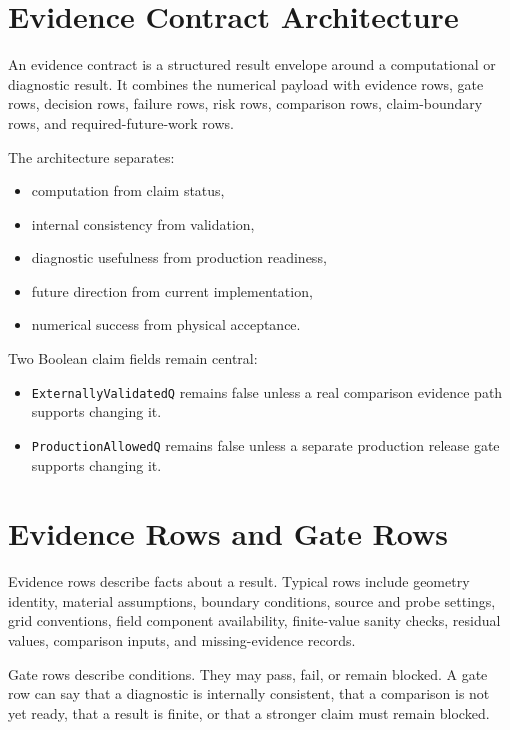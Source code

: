 \documentclass[11pt,a4paper]{article}
\newcommand{\code}[1]{\texttt{#1}}
\begin{document}
\section{Evidence Contract Architecture}

An evidence contract is a structured result envelope around a computational or diagnostic result. It combines the numerical payload with evidence rows, gate rows, decision rows, failure rows, risk rows, comparison rows, claim-boundary rows, and required-future-work rows.

The architecture separates:

\begin{itemize}
  \item computation from claim status,
  \item internal consistency from validation,
  \item diagnostic usefulness from production readiness,
  \item future direction from current implementation,
  \item numerical success from physical acceptance.
\end{itemize}

Two Boolean claim fields remain central:

\begin{itemize}
  \item \code{ExternallyValidatedQ} remains false unless a real comparison evidence path supports changing it.
  \item \code{ProductionAllowedQ} remains false unless a separate production release gate supports changing it.
\end{itemize}

\section{Evidence Rows and Gate Rows}

Evidence rows describe facts about a result. Typical rows include geometry identity, material assumptions, boundary conditions, source and probe settings, grid conventions, field component availability, finite-value sanity checks, residual values, comparison inputs, and missing-evidence records.

Gate rows describe conditions. They may pass, fail, or remain blocked. A gate row can say that a diagnostic is internally consistent, that a comparison is not yet ready, that a result is finite, or that a stronger claim must remain blocked.
\end{document}
